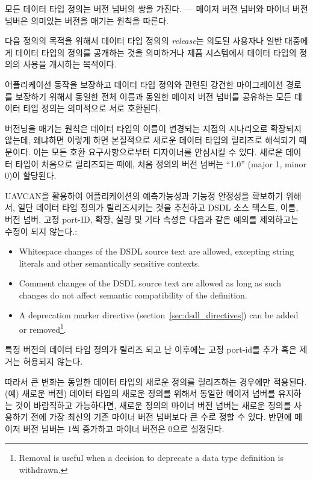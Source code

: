 모든 데이터 타입 정의는 버전 넘버의 쌍을 가진다. ---
메이저 버전 넘버와 마이너 버전 넘버은 의미있는 버전을 매기는 원칙을 따른다.

다음 정의의 목적을 위해서 데이터 타입 정의의 \emph{release}는 의도된 사용자나 일반 대중에게 데이터 타입의 정의를 공개하는 것을 의미하거나 제품 시스템에서 데이터 타입의 정의의 사용을 개시하는 목적이다.

어플리케이션 동작을 보장하고 데이터 타입 정의와 관련된 강건한 마이그레이션 경로를 보장하기 위해서 동일한 전체 이름과 동일한 메이저 버전 넘버를 공유하는 모든 데이터 타입 정의는 의미적으로 서로 호환된다.

버전닝을 매기는 원칙은 데이터 타입의 이름이 변경되는 지점의 시나리오로 확장되지 않는데,
왜냐하면 이렇게 하면 본질적으로 새로운 데이터 타입의 릴리즈로 해석되기 때문이다.
이는 모든 호환 요구사항으로부터 디자이너를 안심시킬 수 있다.
새로운 데이터 타입이 처음으로 릴리즈되는 때에,
처음 정의의 버전 넘버는 ``1.0'' (major 1, minor 0)이 할당된다.

UAVCAN을 활용하여 어플리케이션의 예측가능성과 기능정 안정성을 확보하기 위해서,
일단 데이터 타입 정의가 릴리즈시키는 것을 추천하고 DSDL 소스 텍스트, 이름, 버전 넘버, 고정 port-ID, 확장, 실링 및 기타 속성은 다음과 같은 예외를 제외하고는 수정이 되지 않는다.:
\begin{itemize}
    \item Whitespace changes of the DSDL source text are allowed,
          excepting string literals and other semantically sensitive contexts.

    \item Comment changes of the DSDL source text are allowed as long as such changes
          do not affect semantic compatibility of the definition.

    \item A deprecation marker directive (section~\ref{sec:dsdl_directives}) can be added or removed\footnote{%
              Removal is useful when a decision to deprecate a data type definition is withdrawn.
          }.
\end{itemize}
특정 버전의 데이터 타입 정의가 릴리즈 되고 난 이후에는 고정 port-id를 추가 혹은 제거는 허용되지 않는다.

따라서 큰 변화는 동일한 데이터 타입의 새로운 정의를 릴리즈하는 경우에만 적용된다.(예) 새로운 버전)
데이터 타입의 새로운 정의를 위해서 동일한 메이저 넘버를 유지하는 것이 바람직하고 가능하다면,
새로운 정의의 마이너 버전 넘버는 새로운 정의를 사용하기 전에 가장 최신의 기존 마이너 버전 넘버보다 큰 수로 정할 수 있다.
반면에 메이저 버전 넘버는 1씩 증가하고 마이너 버전은 0으로 설정된다.

